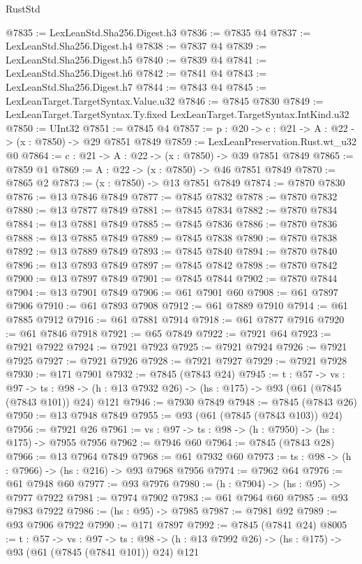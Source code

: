 \begin{lexlean}{RustStd}
\begin{coremodule}
@7835 := LexLeanStd.Sha256.Digest.h3
@7836 := @7835 @4
@7837 := LexLeanStd.Sha256.Digest.h4
@7838 := @7837 @4
@7839 := LexLeanStd.Sha256.Digest.h5
@7840 := @7839 @4
@7841 := LexLeanStd.Sha256.Digest.h6
@7842 := @7841 @4
@7843 := LexLeanStd.Sha256.Digest.h7
@7844 := @7843 @4
@7845 := LexLeanTarget.TargetSyntax.Value.u32
@7846 := @7845 @7830
@7849 := LexLeanTarget.TargetSyntax.Ty.fixed LexLeanTarget.TargetSyntax.IntKind.u32
@7850 := UInt32
@7851 := @7845 @4
@7857 := {p : @20} -> {c : @21} -> {A : @22} -> (x : @7850) -> @29 @7851 @7849
@7859 := LexLeanPreservation.Rust.wt_u32 @0
@7864 := {c : @21} -> {A : @22} -> (x : @7850) -> @39 @7851 @7849
@7865 := @7859 @1
@7869 := {A : @22} -> (x : @7850) -> @46 @7851 @7849
@7870 := @7865 @2
@7873 := (x : @7850) -> @13 @7851 @7849
@7874 := @7870 @7830
@7876 := @13 @7846 @7849
@7877 := @7845 @7832
@7878 := @7870 @7832
@7880 := @13 @7877 @7849
@7881 := @7845 @7834
@7882 := @7870 @7834
@7884 := @13 @7881 @7849
@7885 := @7845 @7836
@7886 := @7870 @7836
@7888 := @13 @7885 @7849
@7889 := @7845 @7838
@7890 := @7870 @7838
@7892 := @13 @7889 @7849
@7893 := @7845 @7840
@7894 := @7870 @7840
@7896 := @13 @7893 @7849
@7897 := @7845 @7842
@7898 := @7870 @7842
@7900 := @13 @7897 @7849
@7901 := @7845 @7844
@7902 := @7870 @7844
@7904 := @13 @7901 @7849
@7906 := @61 @7901 @60
@7908 := @61 @7897 @7906
@7910 := @61 @7893 @7908
@7912 := @61 @7889 @7910
@7914 := @61 @7885 @7912
@7916 := @61 @7881 @7914
@7918 := @61 @7877 @7916
@7920 := @61 @7846 @7918
@7921 := @65 @7849
@7922 := @7921 @64
@7923 := @7921 @7922
@7924 := @7921 @7923
@7925 := @7921 @7924
@7926 := @7921 @7925
@7927 := @7921 @7926
@7928 := @7921 @7927
@7929 := @7921 @7928
@7930 := @171 @7901
@7932 := @7845 (@7843 @24)
@7945 := {t : @57} ->
  {vs : @97} ->
  {ts : @98} -> (h : @13 @7932 @26) -> (hs : @175) -> @93 (@61 (@7845 (@7843 @101)) @24) @121
@7946 := @7930 @7849
@7948 := @7845 (@7843 @26)
@7950 := @13 @7948 @7849
@7955 := @93 (@61 (@7845 (@7843 @103)) @24)
@7956 := @7921 @26
@7961 := {vs : @97} -> {ts : @98} -> (h : @7950) -> (hs : @175) -> @7955 @7956
@7962 := @7946 @60
@7964 := @7845 (@7843 @28)
@7966 := @13 @7964 @7849
@7968 := @61 @7932 @60
@7973 := {ts : @98} -> (h : @7966) -> (hs : @216) -> @93 @7968 @7956
@7974 := @7962 @64
@7976 := @61 @7948 @60
@7977 := @93 @7976
@7980 := (h : @7904) -> (hs : @95) -> @7977 @7922
@7981 := @7974 @7902
@7983 := @61 @7964 @60
@7985 := @93 @7983 @7922
@7986 := (hs : @95) -> @7985
@7987 := @7981 @92
@7989 := @93 @7906 @7922
@7990 := @171 @7897
@7992 := @7845 (@7841 @24)
@8005 := {t : @57} ->
  {vs : @97} ->
  {ts : @98} -> (h : @13 @7992 @26) -> (hs : @175) -> @93 (@61 (@7845 (@7841 @101)) @24) @121

\end{coremodule}
\end{lexlean}
